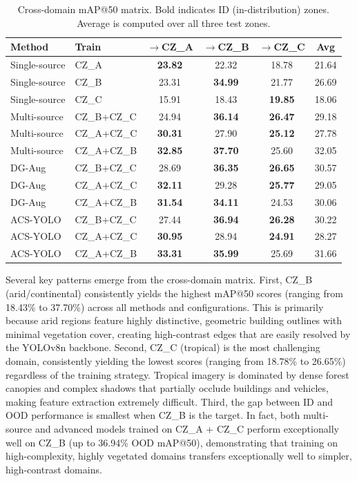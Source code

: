 \documentclass[12pt,a4paper]{article}
\begin{document}
\begin{table}[H]
\centering
\caption{Cross-domain mAP@50 matrix. Bold indicates ID (in-distribution) zones. Average is computed over all three test zones.}
\label{tab:cross_domain}
\small
\begin{tabular}{llcccc}
\toprule
\textbf{Method} & \textbf{Train} & \textbf{$\to$CZ\_A} & \textbf{$\to$CZ\_B} & \textbf{$\to$CZ\_C} & \textbf{Avg} \\
\midrule
Single-source & CZ\_A & \textbf{23.82} & 22.32 & 18.78 & 21.64 \\
Single-source & CZ\_B & 23.31 & \textbf{34.99} & 21.77 & 26.69 \\
Single-source & CZ\_C & 15.91 & 18.43 & \textbf{19.85} & 18.06 \\
\midrule
Multi-source  & CZ\_B+CZ\_C & 24.94 & \textbf{36.14} & \textbf{26.47} & 29.18 \\
Multi-source  & CZ\_A+CZ\_C & \textbf{30.31} & 27.90 & \textbf{25.12} & 27.78 \\
Multi-source  & CZ\_A+CZ\_B & \textbf{32.85} & \textbf{37.70} & 25.60 & 32.05 \\
\midrule
DG-Aug        & CZ\_B+CZ\_C & 28.69 & \textbf{36.35} & \textbf{26.65} & 30.57 \\
DG-Aug        & CZ\_A+CZ\_C & \textbf{32.11} & 29.28 & \textbf{25.77} & 29.05 \\
DG-Aug        & CZ\_A+CZ\_B & \textbf{31.54} & \textbf{34.11} & 24.53 & 30.06 \\
\midrule
ACS-YOLO      & CZ\_B+CZ\_C & 27.44 & \textbf{36.94} & \textbf{26.28} & 30.22 \\
ACS-YOLO      & CZ\_A+CZ\_C & \textbf{30.95} & 28.94 & \textbf{24.91} & 28.27 \\
ACS-YOLO      & CZ\_A+CZ\_B & \textbf{33.31} & \textbf{35.99} & 25.69 & 31.66 \\
\bottomrule
\end{tabular}
\end{table}

Several key patterns emerge from the cross-domain matrix. First, CZ\_B (arid/continental) consistently yields the highest mAP@50 scores (ranging from 18.43\% to 37.70\%) across all methods and configurations. This is primarily because arid regions feature highly distinctive, geometric building outlines with minimal vegetation cover, creating high-contrast edges that are easily resolved by the YOLOv8n backbone. Second, CZ\_C (tropical) is the most challenging domain, consistently yielding the lowest scores (ranging from 18.78\% to 26.65\%) regardless of the training strategy. Tropical imagery is dominated by dense forest canopies and complex shadows that partially occlude buildings and vehicles, making feature extraction extremely difficult. Third, the gap between ID and OOD performance is smallest when CZ\_B is the target. In fact, both multi-source and advanced models trained on CZ\_A + CZ\_C perform exceptionally well on CZ\_B (up to 36.94\% OOD mAP@50), demonstrating that training on high-complexity, highly vegetated domains transfers exceptionally well to simpler, high-contrast domains.
\end{document}
